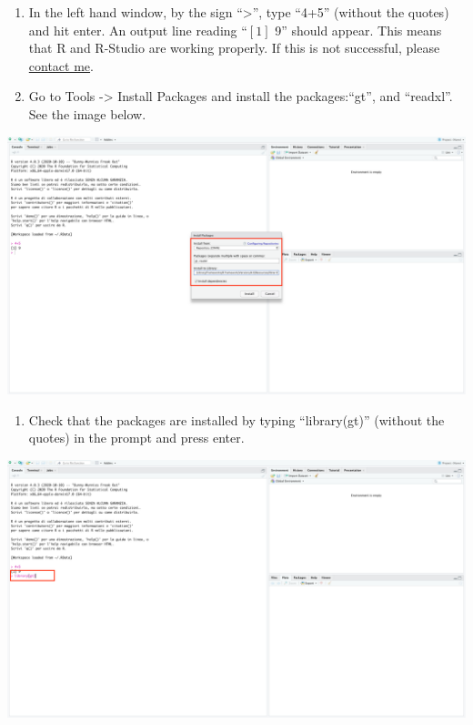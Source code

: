 \documentclass[
]{svmono}
\providecommand{\tightlist}{%
  \setlength{\itemsep}{0pt}\setlength{\parskip}{0pt}}
\begin{document}
\begin{enumerate}
\def\labelenumi{\arabic{enumi}.}
\setcounter{enumi}{5}
\item
  In the left hand window, by the sign ``\textgreater{}'', type ``4+5'' (without the quotes) and hit enter. An output line reading ``\([1]\) 9'' should appear. This means that R and R-Studio are working properly. If this is not successful, please \href{\%5Bmailto:\%20info@federicoroscioli.com\%5D(mailto:\%20info@federicoroscioli.com)\%7B.uri\%7D}{contact me}.
\item
  Go to Tools -\textgreater{} Install Packages and install the packages:``gt'', and ``readxl''. See the image below.\\
\end{enumerate}

\begin{center}\includegraphics[width=0.8\linewidth,]{images/pkg1} \end{center}

\begin{enumerate}
\def\labelenumi{\arabic{enumi}.}
\setcounter{enumi}{7}
\tightlist
\item
  Check that the packages are installed by typing ``library(gt)'' (without the quotes) in the prompt and press enter.\\
\end{enumerate}

\begin{center}\includegraphics[width=0.8\linewidth,]{images/pkg2} \end{center}
\end{document}
